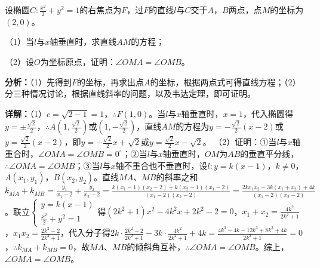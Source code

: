 \begin{question}[points=12]
设椭圆$C:\frac{x^2}{2}+y^2=1$的右焦点为$F$，过$F$的直线$l$与$C$交于$A$，$B$两点，点$M$的坐标为$(2,0)$。

（1）当$l$与$x$轴垂直时，求直线$AM$的方程；

（2）设$O$为坐标原点，证明：$\angle OMA=\angle OMB$。
\begin{solution}

\textbf{分析：}（1）先得到$F$的坐标，再求出点$A$的坐标，根据两点式可得直线方程；（2）分三种情况讨论，根据直线斜率的问题，以及韦达定理，即可证明。

\textbf{详解：}（1）$c=\sqrt{2-1}=1$，$\therefore F(1,0)$。当$l$与$x$轴垂直时，$x=1$，代入椭圆得$y=\pm\frac{\sqrt{2}}{2}$，$\therefore A(1,\frac{\sqrt{2}}{2})$或$(1,-\frac{\sqrt{2}}{2})$，直线$AM$的方程为$y=-\frac{\sqrt{2}}{2}(x-2)$或$y=\frac{\sqrt{2}}{2}(x-2)$，即$y=-\frac{\sqrt{2}}{2}x+\sqrt{2}$或$y=\frac{\sqrt{2}}{2}x-\sqrt{2}$。
（2）证明：①当$l$与$x$轴重合时，$\angle OMA=\angle OMB=0^\circ$；②当$l$与$x$轴垂直时，$OM$为$AB$的垂直平分线，$\therefore \angle OMA=\angle OMB$；③当$l$与$x$轴不重合也不垂直时，设$l:y=k(x-1)$，$k\neq0$，$A(x_1,y_1)$，$B(x_2,y_2)$。直线$MA$、$MB$的斜率之和$k_{MA}+k_{MB}=\frac{y_1}{x_1-2}+\frac{y_2}{x_2-2}=\frac{k(x_1-1)(x_2-2)+k(x_2-1)(x_1-2)}{(x_1-2)(x_2-2)}=\frac{2kx_1x_2-3k(x_1+x_2)+4k}{(x_1-2)(x_2-2)}$。联立$\begin{cases} y=k(x-1) \\ \frac{x^2}{2}+y^2=1 \end{cases}$得$(2k^2+1)x^2-4k^2x+2k^2-2=0$，$x_1+x_2=\frac{4k^2}{2k^2+1}$，$x_1x_2=\frac{2k^2-2}{2k^2+1}$，代入分子得$2k\cdot\frac{2k^2-2}{2k^2+1}-3k\cdot\frac{4k^2}{2k^2+1}+4k=\frac{4k^3-4k-12k^3+8k^3+4k}{2k^2+1}=0$，$\therefore k_{MA}+k_{MB}=0$，故$MA$、$MB$的倾斜角互补，$\therefore \angle OMA=\angle OMB$。综上，$\angle OMA=\angle OMB$。
\end{solution}
\end{question}


